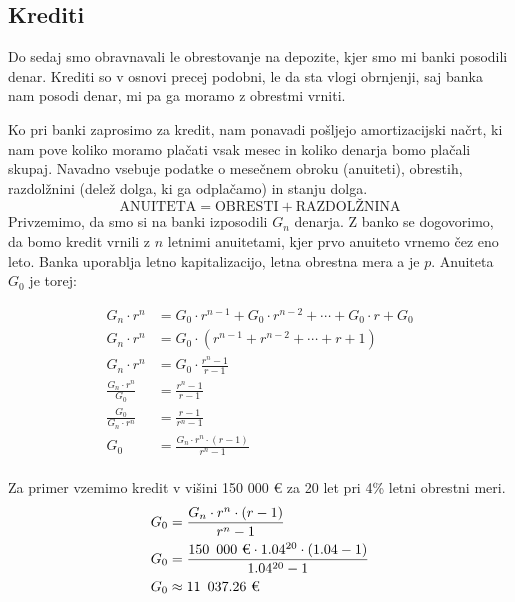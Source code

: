 \documentclass[12pt]{article}
\begin{document}
    \subsection{Krediti}
    Do sedaj smo obravnavali le obrestovanje na depozite, kjer smo mi banki posodili denar.
    Krediti so v osnovi precej podobni, le da sta vlogi obrnjenji, saj banka nam posodi
    denar, mi pa ga moramo z obrestmi vrniti.

    Ko pri banki zaprosimo za kredit, nam ponavadi pošljejo amortizacijski načrt, ki nam
    pove koliko moramo plačati vsak mesec in koliko denarja bomo plačali skupaj. Navadno
    vsebuje podatke o mesečnem obroku (anuiteti), obrestih, razdolžnini (delež dolga, ki 
    ga odplačamo) in stanju dolga. 
    $$\text{ANUITETA} = \text{OBRESTI} + \text{RAZDOLŽNINA}$$
    Privzemimo, da smo si na banki izposodili $G_n$ denarja. Z banko se dogovorimo, da bomo
    kredit vrnili z $n$ letnimi anuitetami, kjer prvo anuiteto vrnemo čez eno leto. Banka
    uporablja letno kapitalizacijo, letna obrestna mera a je $p$. Anuiteta $G_0$ je torej:
    
    \begin{equation}
        \begin{split}
            G_n \cdot r^n & = G_0 \cdot r^{n - 1} + G_0 \cdot r^{n - 2} + \cdots + G_0 \cdot r + G_0 \\
            G_n \cdot r^n & = G_0 \cdot (r^{n - 1} + r^{n - 2} + \cdots + r + 1) \\
            G_n \cdot r^n & = G_0 \cdot \frac{r^n - 1}{r - 1} \\
            \frac{G_n \cdot r^n}{G_0} & = \frac{r^n - 1}{r - 1} \\
            \frac{G_0}{G_n \cdot r^n} & = \frac{r - 1}{r^n - 1} \\
            G_0 & = \frac{G_n \cdot r^n \cdot (r - 1)}{r^n - 1} \\
        \end{split}
    \end{equation}

    Za primer vzemimo kredit v višini 150 000 € za 20 let pri 4\% letni obrestni meri. 
    \begin{equation}
        \begin{split}
            G_0 & = \frac{G_n \cdot r^n \cdot (r - 1)}{r^n - 1} \\
            G_0 & = \frac{150 \enskip 000 \text{ €} \cdot 1.04^{20} \cdot (1.04 - 1)}{1.04^{20} - 1} \\
            G_0 & \approx 11 \enskip 037.26 \text{ €}
        \end{split}
    \end{equation}
\end{document}
